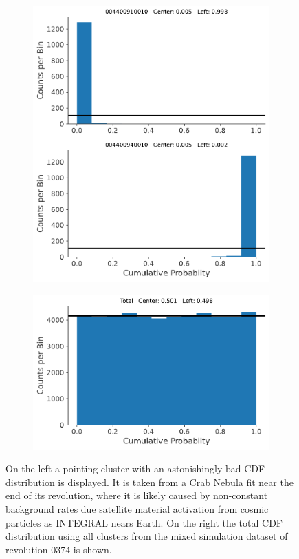\documentclass{report}
\begin{document}
\begin{figure}[h]
  \centering
  \begin{subfigure}{0.5\textwidth}
    \centering
    \includegraphics[width=0.9\linewidth]{Images/PPC_and_Background_Analysis/004400910010_004400940010_cdf.pdf}
  \end{subfigure}%
  \begin{subfigure}{.5\textwidth}
    \centering
    \includegraphics[width=.9\linewidth]{Images/PPC_and_Background_Analysis/Total_cdf.pdf}
  \end{subfigure}
  \caption{On the left a pointing cluster with an astonishingly bad CDF distribution is displayed. It is taken from a Crab Nebula fit near the end of its revolution, where it is likely caused by non-constant background rates due satellite material activation from cosmic particles as INTEGRAL nears Earth. On the right the total CDF distribution using all clusters from the mixed simulation dataset of revolution 0374 is shown.}
  \label{fig ppc really bad total}
\end{figure}
\end{document}
